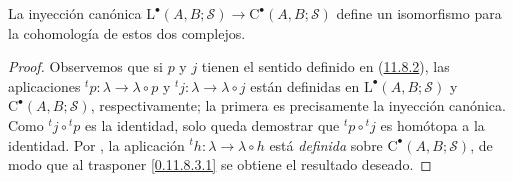 \begin{proposition}[11.8.5]
\label{0.11.8.5-fr}
{La inyección canónica
$\mathrm L^\bullet(A,B;\mathscr S)\longrightarrow\mathrm C^\bullet(A,B;\mathscr S)$
define un isomorfismo para la cohomología de estos dos complejos.}
\end{proposition}

\begin{proof}
Observemos que si $p$ y $j$ tienen el sentido definido en (\hyperref[0.11.8.2-fr]{11.8.2}), las aplicaciones ${}^tp:\lambda\to\lambda\circ p$ y ${}^tj:\lambda\to\lambda\circ j$ están definidas en $\mathrm L^\bullet(A,B;\mathscr S)$ y
$\mathrm C^\bullet(A,B;\mathscr S)$, respectivamente; la primera es precisamente
la inyección canónica.
Como ${}^tj\circ{}^tp$ es la identidad, solo queda demostrar
que ${}^tp\circ{}^tj$ es homótopa a la identidad.
Por , la aplicación
${}^th:\lambda\to\lambda\circ h$
está \emph{definida} sobre $\mathrm C^\bullet(A,B;\mathscr S)$, de modo que al trasponer
\eqref{0.11.8.3.1} se obtiene el resultado deseado.
\end{proof}

